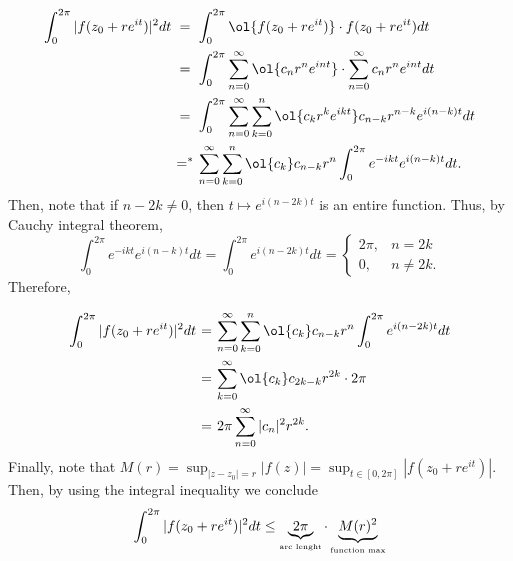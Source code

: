 \[ \everymath{\displaystyle}
\arraycolsep=1.8pt\def\arraystretch{2.5}
\begin{array}{rcl}
    \int_{0}^{2\pi}|f(z_0+re^{it})|^2 dt & = & \int_{0}^{2\pi} \ol{f(z_0+re^{it})} \cdot f(z_0+re^{it}) dt\\
    & = & \int_{0}^{2\pi} \sum_{n=0}^{\infty}\ol{c_n r^n e^{int}} \cdot \sum_{n=0}^{\infty}c_n r^n e^{int} dt\\
    & = & \int_{0}^{2\pi} \sum_{n = 0}^\infty \sum_{k = 0}^n \ol{c_k r^k e^{ikt}} c_{n-k} r^{n-k} e^{i(n-k)t} dt\\
    & =^* & \sum_{n = 0}^\infty \sum_{k = 0}^n \ol{c_k} c_{n-k} r^{n} \int_{0}^{2\pi} e^{-ikt}e^{i(n-k)t} dt.
\end{array} \]
Then, note that if $n-2k \neq 0$, then $t\mapsto e^{i(n-2k)t}$ is an entire function. Thus, by Cauchy integral theorem,
\[ \int_{0}^{2\pi} e^{-ikt}e^{i(n-k)t} dt = \int_{0}^{2\pi} e^{i(n-2k)t} dt = \begin{cases}
    2\pi, & n = 2k\\
    0, & n \neq 2k.
\end{cases} \]
Therefore,
\[  \everymath{\displaystyle}
\arraycolsep=1.8pt\def\arraystretch{2.5}
\begin{array}{rcl}
    \int_{0}^{2\pi}|f(z_0+re^{it})|^2 dt & = & \sum_{n = 0}^\infty \sum_{k = 0}^n \ol{c_k} c_{n-k} r^{n} \int_{0}^{2\pi} e^{i(n-2k)t} dt\\
    & = & \sum_{k = 0}^{\infty} \ol{c_{k}}c_{2k-k} r^{2k} \cdot 2\pi \\
    & = & 2\pi \sum_{n = 0}^{\infty} |c_n|^2 r^{2k}.
\end{array} \]
Finally, note that $\displaystyle M(r) = \sup_{|z-z_0| = r}|f(z)| = \sup_{t\in[0,2\pi]} |f(z_0+re^{it})|$. Then, by using the integral inequality we conclude
\[ \int_{0}^{2\pi}|f(z_0+re^{it})|^2 dt \leq \underbrace{2\pi}_{\mbox{\tiny{arc lenght}}} \cdot \underbrace{M(r)^2}_{\mbox{\tiny{function max}}} \]